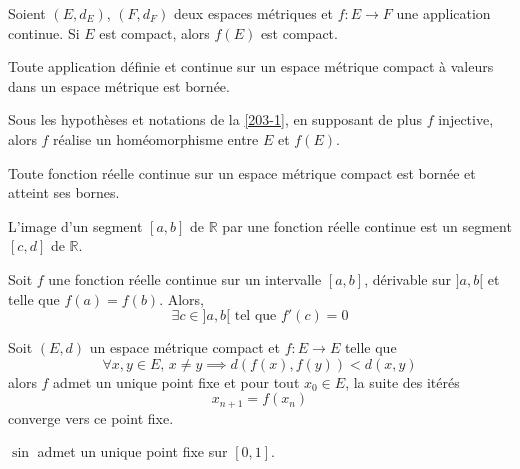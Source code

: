 
	\begin{proposition}
		\label{203-1}
		Soient $(E, d_E)$, $(F, d_F)$ deux espaces métriques et $f : E \rightarrow F$ une application continue. Si $E$ est compact, alors $f(E)$ est compact.
	\end{proposition}

	\begin{corollary}
		Toute application définie et continue sur un espace métrique compact à valeurs dans un espace métrique est bornée.
	\end{corollary}

	\begin{proposition}
		Sous les hypothèses et notations de la \cref{203-1}, en supposant de plus $f$ injective, alors $f$ réalise un homéomorphisme entre $E$ et $f(E)$.
	\end{proposition}

	\begin{theorem}
		Toute fonction réelle continue sur un espace métrique compact est bornée et atteint ses bornes.
	\end{theorem}

	\begin{corollary}
		L'image d'un segment $[a,b]$ de $\mathbb{R}$ par une fonction réelle continue est un segment $[c,d]$ de $\mathbb{R}$.
	\end{corollary}


	\begin{application}
		Soit $f$ une fonction réelle continue sur un intervalle $[a,b]$, dérivable sur $]a,b[$ et telle que $f(a) = f(b)$. Alors,
		\[ \exists c \in ]a,b[ \text{ tel que } f'(c) = 0 \]
	\end{application}


	\begin{application}
		Soit $(E,d)$ un espace métrique compact et $f : E \rightarrow E$ telle que
		\[ \forall x, y \in E, \, x \neq y \implies d(f(x), f(y)) < d(x,y) \]
		alors $f$ admet un unique point fixe et pour tout $x_0 \in E$, la suite des itérés
		\[ x_{n+1} = f(x_n) \]
		converge vers ce point fixe.
	\end{application}

	\begin{example}
		$\sin$ admet un unique point fixe sur $[0,1]$.
	\end{example}

